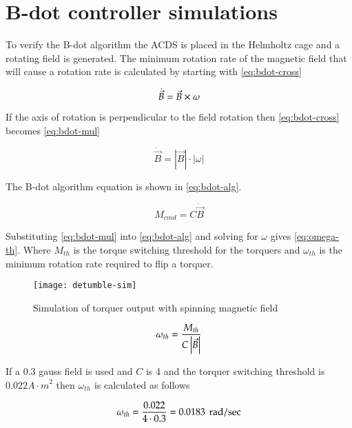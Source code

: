 \section{B-dot controller simulations}

To verify the B-dot algorithm the \ac{ACDS} is placed in the Helmholtz cage and a rotating field is generated. The minimum rotation rate of the magnetic field that will cause a rotation rate is calculated by starting with \cref{eq:bdot-cross}

\begin{equation}
    \dot{\vec{B}} = \vec{B} \times \omega
    \label{eq:bdot-cross}
\end{equation}

If the axis of rotation is perpendicular to the field rotation then \cref{eq:bdot-cross} becomes \cref{eq:bdot-mul}

\begin{equation}
    \dot{\vec{B}} = \left| \vec{B} \right| \cdot \left| \omega \right|
    \label{eq:bdot-mul}
\end{equation}

The B-dot algorithm equation is shown in \cref{eq:bdot-alg}.

\begin{equation}
    M_{cmd} = C \dot{\vec{B}} 
    \label{eq:bdot-alg}
\end{equation}

Substituting \cref{eq:bdot-mul} into \cref{eq:bdot-alg} and solving for $\omega$ gives \cref{eq:omega-th}. Where $M_{th}$ is the torque switching threshold for the torquers and $\omega_{th}$ is the minimum rotation rate required to flip a torquer.

\begin{sidewaysfigure}
    \centering
    \texttt{[image: detumble-sim]}
  \caption{Simulation of torquer output with spinning magnetic field}
    \label{fig:detumble-sim}
\end{sidewaysfigure}

\begin{equation}
    \omega _ {th} = {M _ {th} \over{ {C \left| \vec{B} \right|}}}
    \label{eq:omega-th}
\end{equation}

If a 0.3 gauss field is used and $C$ is 4 and the torquer switching threshold is $0.022 \unit{A \cdot m} ^2$ then $\omega_{th}$ is calculated as follows

\begin{equation}
    \omega _ {th} = { 0.022 \over{ {4 \cdot 0.3}}} = 0.0183 ~ \, \mathrm{rad / sec}
\end{equation}

